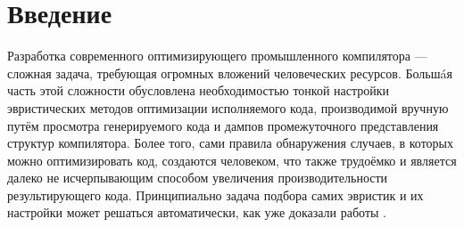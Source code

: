 \chapter{Введение}
Разработка современного оптимизирующего промышленного компилятора --- сложная задача, требующая огромных вложений человеческих ресурсов. Больш\'{a}я часть этой сложности обусловлена необходимостью тонкой настройки эвристических методов оптимизации исполняемого кода, производимой вручную путём просмотра генерируемого кода и дампов промежуточного представления структур компилятора. Более того, сами правила обнаружения случаев, в которых можно оптимизировать код, создаются человеком, что также трудоёмко и является далеко не исчерпывающим способом увеличения производительности результирующего кода. Принципиально задача подбора самих эвристик и их настройки может решаться автоматически, как уже доказали работы {}.